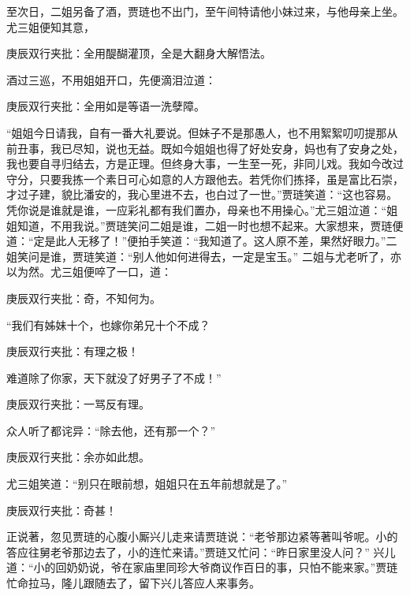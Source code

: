 \begin{parag}


    至次日，二姐另备了酒，贾琏也不出门，至午间特请他小妹过来，与他母亲上坐。尤三姐便知其意，\begin{note}庚辰双行夹批：全用醍醐灌顶，全是大翻身大解悟法。\end{note}酒过三巡，不用姐姐开口，先便滴泪泣道：\begin{note}庚辰双行夹批：全用如是等语一洗孽障。\end{note}“姐姐今日请我，自有一番大礼要说。但妹子不是那愚人，也不用絮絮叨叨提那从前丑事，我已尽知，说也无益。既如今姐姐也得了好处安身，妈也有了安身之处，我也要自寻归结去，方是正理。但终身大事，一生至一死，非同儿戏。我如今改过守分，只要我拣一个素日可心如意的人方跟他去。若凭你们拣择，虽是富比石崇，才过子建，貌比潘安的，我心里进不去，也白过了一世。”贾琏笑道：“这也容易。凭你说是谁就是谁，一应彩礼都有我们置办，母亲也不用操心。”尤三姐泣道：“姐姐知道，不用我说。”贾琏笑问二姐是谁，二姐一时也想不起来。大家想来，贾琏便道：“定是此人无移了！”便拍手笑道：“我知道了。这人原不差，果然好眼力。”二姐笑问是谁，贾琏笑道：“别人他如何进得去，一定是宝玉。” 二姐与尤老听了，亦以为然。尤三姐便啐了一口，道：\begin{note}庚辰双行夹批：奇，不知何为。\end{note}“我们有姊妹十个，也嫁你弟兄十个不成？\begin{note}庚辰双行夹批：有理之极！\end{note}难道除了你家，天下就没了好男子了不成！”\begin{note}庚辰双行夹批：一骂反有理。\end{note}众人听了都诧异：“除去他，还有那一个？”\begin{note}庚辰双行夹批：余亦如此想。\end{note}尤三姐笑道：“别只在眼前想，姐姐只在五年前想就是了。”\begin{note}庚辰双行夹批：奇甚！\end{note}
\end{parag}


\begin{parag}


    正说著，忽见贾琏的心腹小厮兴儿走来请贾琏说：“老爷那边紧等著叫爷呢。小的答应往舅老爷那边去了，小的连忙来请。”贾琏又忙问：“昨日家里没人问？” 兴儿道：“小的回奶奶说，爷在家庙里同珍大爷商议作百日的事，只怕不能来家。”贾琏忙命拉马，隆儿跟随去了，留下兴儿答应人来事务。
\end{parag}


